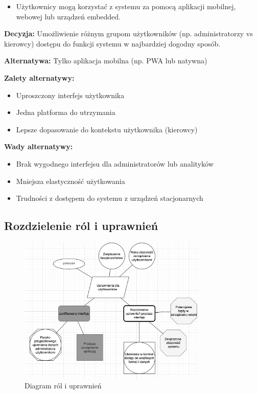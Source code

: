 \documentclass[12pt]{article}
\begin{document}
\begin{itemize}
\item Użytkownicy mogą korzystać z systemu za pomocą aplikacji mobilnej, webowej lub urządzeń embedded.
\end{itemize}

\textbf{Decyzja:} Umożliwienie różnym grupom użytkowników (np. administratorzy vs kierowcy) dostępu do funkcji systemu w najbardziej dogodny sposób.

\textbf{Alternatywa:} Tylko aplikacja mobilna (np. PWA lub natywna)

\textbf{Zalety alternatywy:}
\begin{itemize}
\item Uproszczony interfejs użytkownika
\item Jedna platforma do utrzymania
\item Lepsze dopasowanie do kontekstu użytkownika (kierowcy)
\end{itemize}

\textbf{Wady alternatywy:}
\begin{itemize}
\item Brak wygodnego interfejsu dla administratorów lub analityków
\item Mniejsza elastyczność użytkowania
\item Trudności z dostępem do systemu z urządzeń stacjonarnych
\end{itemize}

\subsection{Rozdzielenie ról i uprawnień}
\begin{figure}[h]
\centering
\includegraphics[width=0.8\textwidth]{uprawnienia_dla_uzytkownikow.png}
\caption{Diagram ról i uprawnień}
\label{fig:roles}
\end{figure}
\end{document}
